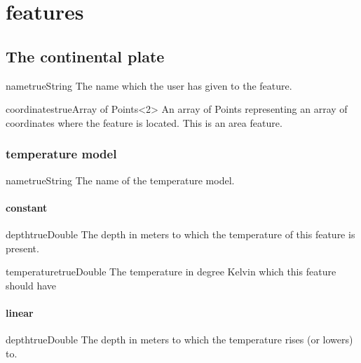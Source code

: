 \documentclass{book}
\begin{document}
\section{features}

\subsection{The continental plate}
\begin{parameterbox}{name}{true}{String}{}
The name which the user has given to the feature.
\end{parameterbox}

\begin{parameterbox}{coordinates}{true}{Array of Points<2>}{}
An array of Points representing an array of coordinates where the feature is located. This is an area feature.
\end{parameterbox}

\subsubsection{temperature model}
\begin{parameterbox}{name}{true}{String}{}
The name of the temperature model.
\end{parameterbox}

\paragraph{constant}
\begin{parameterbox}{depth}{true}{Double}{}
The depth in meters to which the temperature of this feature is present.
\end{parameterbox}

\begin{parameterbox}{temperature}{true}{Double}{}
The temperature in degree Kelvin which this feature should have
\end{parameterbox}

\paragraph{linear}
\begin{parameterbox}{depth}{true}{Double}{}
The depth in meters to which the temperature rises (or lowers) to.
\end{parameterbox}
\end{document}

